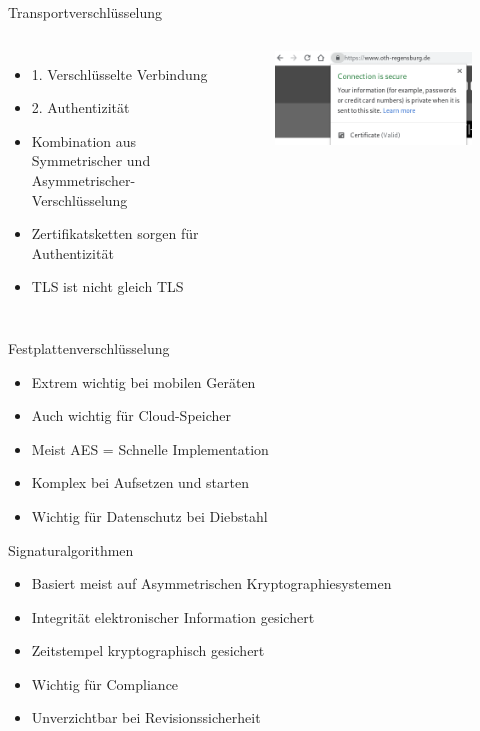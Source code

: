 \documentclass[10pt]{beamer}
\begin{document}
\begin{frame}[fragile]{Transportverschlüsselung}
\begin{columns}[T,c,onlytextwidth]
	\begin{itemize}
		\item 1. Verschlüsselte Verbindung
		\item 2. Authentizität
		\item Kombination aus Symmetrischer und Asymmetrischer-Verschlüsselung
		\item Zertifikatsketten sorgen für Authentizität
		\item TLS ist nicht gleich TLS
	\end{itemize}
	\begin{figure}
		\includegraphics[width=1\textwidth]{images/oth-key}
	\end{figure}
\end{columns}
\end{frame}

\begin{frame}[fragile]{Festplattenverschlüsselung}
	\begin{itemize}
	\item Extrem wichtig bei mobilen Geräten
	\item Auch wichtig für Cloud-Speicher
	\item Meist AES = Schnelle Implementation
	\item Komplex bei Aufsetzen und starten
	\item Wichtig für Datenschutz bei Diebstahl
\end{itemize}
\end{frame}

\begin{frame}[fragile]{Signaturalgorithmen}
	\begin{itemize}
	\item Basiert meist auf Asymmetrischen Kryptographiesystemen
	\item Integrität elektronischer Information gesichert
	\item Zeitstempel kryptographisch gesichert
	\item Wichtig für Compliance
	\item Unverzichtbar bei Revisionssicherheit
\end{itemize}
\end{frame}
\end{document}
